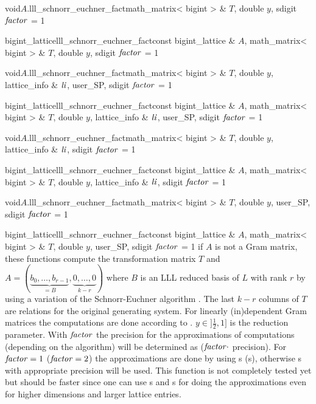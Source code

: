 \begin{fcode}{void}{$A$.lll_schnorr_euchner_fact}{math_matrix< bigint > & $T$, double $y$,
    sdigit $\mathit{factor}$ = 1}%
\end{fcode}

\begin{fcode}{bigint_lattice}{lll_schnorr_euchner_fact}{const bigint_lattice & $A$,
    math_matrix< bigint > & $T$, double $y$, sdigit $\mathit{factor}$ = 1}%
\end{fcode}

\begin{fcode}{void}{$A$.lll_schnorr_euchner_fact}{math_matrix< bigint > & $T$, double $y$,
    lattice_info & $\mathit{li}$, user_SP, sdigit $\mathit{factor}$ = 1}%
\end{fcode}

\begin{fcode}{bigint_lattice}{lll_schnorr_euchner_fact}{const bigint_lattice & $A$,
    math_matrix< bigint > & $T$, double $y$, lattice_info & $\mathit{li}$, user_SP, sdigit $\mathit{factor}$ = 1}%
\end{fcode}

\begin{fcode}{void}{$A$.lll_schnorr_euchner_fact}{math_matrix< bigint > & $T$, double $y$,
    lattice_info & $\mathit{li}$, sdigit $\mathit{factor}$ = 1}%
\end{fcode}

\begin{fcode}{bigint_lattice}{lll_schnorr_euchner_fact}{const bigint_lattice & $A$,
    math_matrix< bigint > & $T$, double $y$, lattice_info & $\mathit{li}$, sdigit $\mathit{factor}$ = 1}%
\end{fcode}

\begin{fcode}{void}{$A$.lll_schnorr_euchner_fact}{math_matrix< bigint > & $T$, double $y$,
    user_SP, sdigit $\mathit{factor}$ = 1}%
\end{fcode}

\begin{fcode}{bigint_lattice}{lll_schnorr_euchner_fact}{const bigint_lattice & $A$,
    math_matrix< bigint > & $T$, double $y$, user_SP, sdigit $\mathit{factor}$ = 1}%
  if $A$ is not a Gram matrix, these functions compute the transformation matrix $T$ and $A =
  (\underbrace{b_0, \dots, b_{r-1}}_{=B}, \underbrace{0, \dots, 0}_{k-r})$ where $B$ is an LLL
  reduced basis of $L$ with rank $r$ by using a variation of the Schnorr-Euchner algorithm
  \cite{Wetzel/Backes:2000}.  The last $k-r$ columns of $T$ are relations for the original
  generating system.  For linearly (in)dependent Gram matrices the computations are done
  according to \cite{Cohen:1995}.  $y\in ]\frac{1}{2},1]$ is the reduction parameter.  With
  $\mathit{factor}$ the precision for the approximations of computations (depending on the algorithm)
  will be determined as ($\mathit{factor} \cdot$  precision).  For $\mathit{factor} = 1$ ($\mathit{factor}
  = 2$) the approximations are done by using s (s), otherwise
  s with appropriate precision will be used.  This function is not completely
  tested yet but should be faster since one can use s and s for doing
  the approximations even for higher dimensions and larger lattice entries.
\end{fcode}


